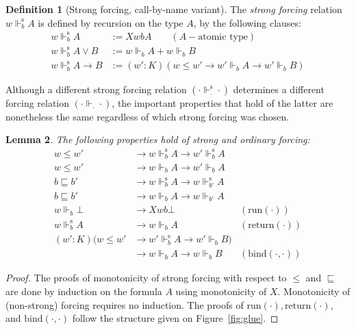 \documentclass{eptcs}
\newcommand{\forces}[3]{{#1}\Vdash_{#2}{#3}}
\newcommand{\sforces}[3]{{#1}\Vdash^{\text{s}}_{#2}{#3}}
\newcommand{\run}[1]{\text{run}{(#1)}}
\newcommand{\ret}[1]{\text{return}{(#1)}}
\newcommand{\bind}[2]{\text{bind}{(#1,#2)}}
\theoremstyle{definition}
\newtheorem{definition}{Definition}[section]
\theoremstyle{plain}
\newtheorem{lemma}[definition]{Lemma}
\theoremstyle{remark}
\begin{document}
\begin{definition}[Strong forcing, call-by-name variant] The \emph{strong forcing} relation $\sforces{w}{b}{A}$ is defined by recursion on the type $A$, by the following clauses:
\begin{align*}
\sforces{w}{b}{A} &:= X w b A \qquad (A -\text{atomic type})\\
\sforces{w}{b}{A\vee B} &:= \forces{w}{b}{A} + \forces{w}{b}{B}\\
\sforces{w}{b}{A\to B} &:= (w':K)(w\le w' \to \forces{w'}{b}{A} \to \forces{w'}{b}{B})
\end{align*}
\end{definition}

Although a different strong forcing relation $(\sforces{\cdot}{\cdot}{\cdot})$ determines a different forcing relation $(\forces{\cdot}{\cdot}{\cdot})$, the important properties that hold of the latter are nonetheless the same regardless of which strong forcing was chosen.

\begin{lemma} The following properties hold of strong and ordinary forcing:
  \begin{align*}
    w\le w' &\to \sforces{w}{b}{A} \to \sforces{w'}{b}{A}\\
    w\le w' &\to \forces{w}{b}{A} \to \forces{w'}{b}{A}\\
    b\sqsubseteq b' &\to \sforces{w}{b}{A} \to \sforces{w}{b'}{A}\\
    b\sqsubseteq b' &\to \forces{w}{b}{A} \to \forces{w}{b'}{A}\\
    \forces{w}{b}{\bot} &\to X w b \bot & (\run{\cdot})\\
    \sforces{w}{b}{A} &\to \forces{w}{b}{A} & (\ret{\cdot})\\
    (w':K)(w\le w' &\to \sforces{w'}{b}{A}\to\forces{w'}{b}{B}) \\
    & \to \forces{w}{b}{A}\to \forces{w}{b}{B} & (\bind{\cdot}{\cdot})
  \end{align*}
\end{lemma}
\begin{proof} The proofs of monotonicity of strong forcing with respect to $\le$ and $\sqsubseteq$ are done by induction on the formula $A$ using monotonicity of $X$. Monotonicity of (non-strong) forcing requires no induction. The proofs of $\run{\cdot}, \ret{\cdot}$, and $\bind{\cdot}{\cdot}$ follow the structure given on Figure~\ref{fig:glue}.
\end{proof}
\end{document}
